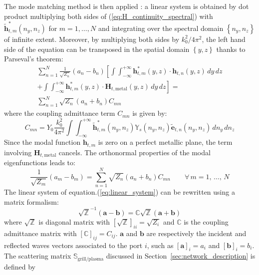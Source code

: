 The mode matching method is then applied \cite{berio1996}: a linear system is obtained by dot product multiplying both sides of (\ref{eq:H_continuity_spectral}) with $\tilde{\mathbf{h}}_{t,m}^{*}\left(n_{y},n_{z}\right)$ for $m=1,\ldots,N$ and integrating over the spectral domain $\left\{ n_{y},n_{z}\right\} $ of infinite extent. Moreover, by multiplying both sides by $k_{0}^{2}/4\pi^{2}$, the left hand side of the equation can be transposed in the spatial domain $\left\{ y,z\right\} $ thanks to Parseval's theorem:
\begin{eqnarray}
\sum_{n=1}^{N}\frac{1}{\sqrt{Z_{n}}}\left(a_{n}-b_{n}\right)\left[\int\int_{-\infty}^{+\infty}\!\mathbf{h}_{t,m}^{*}\left(y,z\right)\cdot\mathbf{h}_{t,n}\left(y,z\right)\, dy\, dz\right.\\
\left.+\int\int_{-\infty}^{+\infty}\!\mathbf{h}_{t,m}^{*}\left(y,z\right)\cdot\mathbf{H}_{t,\mbox{metal}}\left(y,z\right)\, dy\, dz\right]=\nonumber \\
\sum_{n=1}^{N}\sqrt{Z_{n}}\left(a_{n}+b_{n}\right)C_{mn}\nonumber 
\end{eqnarray}
where the coupling admittance term $C_{mn}$ is given by:
\begin{equation}
C_{mn}=Y_{0}\frac{k_{0}^{2}}{4\pi^{2}}\int\int_{-\infty}^{+\infty}\tilde{\mathbf{h}}_{t,m}^{*}\left(n_{y},n_{z}\right)\mathbb{Y}_{s}\left(n_{y},n_{z}\right)\mathbf{\tilde{e}}_{t,n}\left(n_{y},n_{z}\right)\, dn_{y}\, dn_{z}\label{eq:coupling_admittance}
\end{equation}
Since the modal function $\mathbf{h}_{t,m}$ is zero on a perfect metallic plane, the term involving $\mathbf{H}_{t,\mbox{metal}}$ cancels. The orthonormal properties of the modal eigenfunctions\cite{Collin1990,Harrington2001}
leads to:
\begin{equation}
\frac{1}{\sqrt{Z_{m}}}\left(a_{m}-b_{m}\right)=\sum_{n=1}^{N}\sqrt{Z_{n}}\left(a_{n}+b_{n}\right)C_{mn}\qquad\forall\, m=1,\,\ldots,\, N\label{eq:linear_system}
\end{equation}
The linear system of equation.(\ref{eq:linear_system}) can be rewritten
using a matrix formalism:
\begin{equation}
\sqrt{\mathbb{Z}}^{-1}\left(\mathbf{a}-\mathbf{b}\right)=\mathbb{C}\sqrt{\mathbb{Z}}\left(\mathbf{a}+\mathbf{b}\right)\label{eq:linear_system_matrix}
\end{equation}
where $\sqrt{\mathbb{Z}}$ is diagonal matrix with $\left[\sqrt{\mathbb{Z}}\right]_{ii}=\sqrt{Z_{i}}$ and $\mathbb{C}$ is the coupling admittance matrix with $\left[\mathbb{C}\right]_{ij}=C_{ij}$. $\mathbf{a}$ and $\mathbf{b}$ are respectively the incident and reflected waves vectors associated to the port $i$, such as $\left[\mathbf{a}\right]_{i}=a_{i}$ and $\left[\mathbf{b}\right]_{i}=b_{i}$. The scattering matrix $\mathbb{S}_{\mbox{grill/plasma}}$ discussed in Section~\ref{sec:network_description} is defined by

